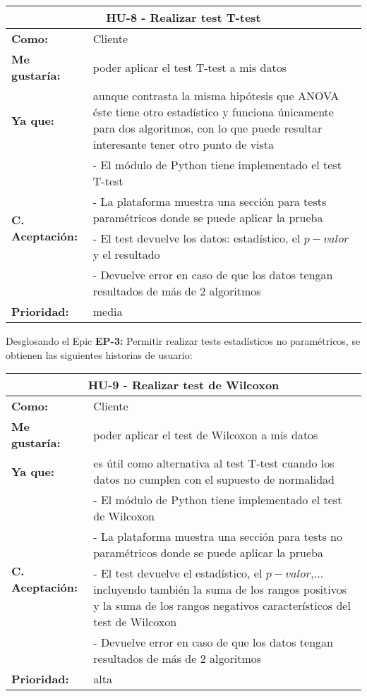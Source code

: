 \begin{table}[H]
	\begin{tabular}{| p{3cm}| p{11cm} |}
		\hline
		\multicolumn{2}{|c|}{\textbf{HU-8} - Realizar test T-test} \\ \hline
		\textbf{Como:} & Cliente \\ \hline
		\textbf{Me gustaría:} & poder aplicar el test T-test a mis datos \\ \hline
		\textbf{Ya que:} & aunque contrasta la misma hipótesis que ANOVA éste tiene otro estadístico y funciona únicamente para dos algoritmos, con lo que puede resultar interesante tener otro punto de vista \\ \hline
		\multirow{4}{11cm}{\textbf{C. Aceptación:}} & - El módulo de Python tiene implementado el test T-test \\
		& - La plataforma muestra una sección para tests paramétricos donde se puede aplicar la prueba \\
		& - El test devuelve los datos: estadístico, el $p-valor$ y el resultado \\
		& - Devuelve error en caso de que los datos tengan resultados de más de 2 algoritmos \\ \hline
		\textbf{\textbf{Prioridad:}} & media \\ \hline
	\end{tabular}
\end{table}


\clearpage
Desglosando el Epic \textbf{EP-3:} Permitir realizar tests estadísticos no paramétricos, se obtienen las siguientes historias de usuario:

\begin{table}[H]
	\begin{tabular}{| p{3cm}| p{11cm} |}
		\hline
		\multicolumn{2}{|c|}{\textbf{HU-9} - Realizar test de Wilcoxon} \\ \hline
		\textbf{Como:} & Cliente \\ \hline
		\textbf{Me gustaría:} & poder aplicar el test de Wilcoxon a mis datos \\ \hline
		\textbf{Ya que:} & es útil como alternativa al test T-test cuando los datos no cumplen con el supuesto de normalidad \\ \hline
		\multirow{4}{11cm}{\textbf{C. Aceptación:}} & - El módulo de Python tiene implementado el test de Wilcoxon \\
		& - La plataforma muestra una sección para tests no paramétricos donde se puede aplicar la prueba \\
		& - El test devuelve el estadístico, el $p-valor$,... incluyendo también la suma de los rangos positivos y la suma de los rangos negativos característicos del test de Wilcoxon \\
		& - Devuelve error en caso de que los datos tengan resultados de más de 2 algoritmos \\ \hline
		\textbf{\textbf{Prioridad:}} & alta \\ \hline
	\end{tabular}
\end{table}

